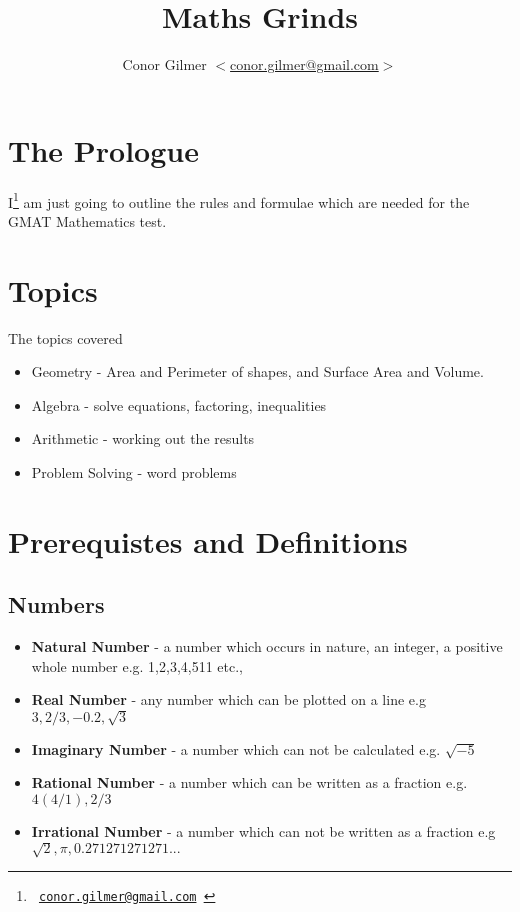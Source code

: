 \documentclass{article}
\title{\gmat{} Maths Grinds}
\author{Conor Gilmer $<$\href{mailto:conor.gilmer@gmail.com}{conor.gilmer@gmail.com}$>$}
\newcommand{\email}[1]{\texttt{#1}}
\begin{document}
\pagestyle{headings}
\maketitle

\tableofcontents


\newpage
\section{The Prologue}
I\footnote{\email{ \href{mailto:conor.gilmer@gmail.com.com}{conor.gilmer@gmail.com} }} am just going to outline the rules and formulae which are needed for the GMAT Mathematics test.

\section{Topics}

The topics covered

\begin{itemize}
\item Geometry - Area and Perimeter of shapes, and Surface Area and Volume.
\item Algebra - solve equations, factoring, inequalities
\item Arithmetic - working out the results
\item Problem Solving - word problems
\end{itemize}


\newpage
\section{Prerequistes and Definitions}
\subsection{Numbers}
\begin{itemize}
\item \textbf{Natural Number} - a number which occurs in nature, an integer, a positive whole number e.g. 1,2,3,4,511 etc.,
\item \textbf{Real Number} - any number which can be plotted on a line e.g $3, 2/3, -0.2, \sqrt{3}$
\item \textbf{Imaginary Number} - a number which can not be calculated e.g. $\sqrt{-5}$
\item \textbf{Rational Number} - a number which can be written as a fraction e.g. $4 (4/1) , 2/3$
\item \textbf{Irrational Number} - a number which can not be written as a fraction e.g $\sqrt{2}, \pi, 0.271271271271...$
\end{itemize}
\end{document}
